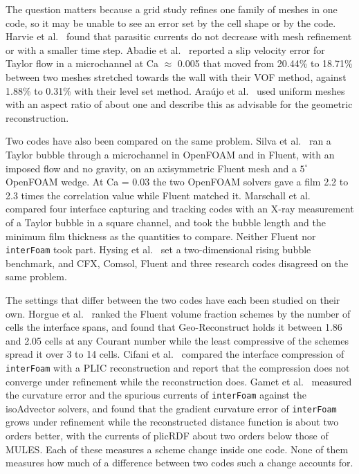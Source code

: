\documentclass[11pt,a4paper]{article}
\begin{document}
The question matters because a grid study refines one family of meshes in one code, so it may be unable to see an error set by the cell shape or by the code. Harvie et al.\ \cite{harvie2006analysis} found that parasitic currents do not decrease with mesh refinement or with a smaller time step. Abadie et al.\ \cite{abadie2015combined} reported a slip velocity error for Taylor flow in a microchannel at Ca $\approx$ 0.005 that moved from 20.44\% to 18.71\% between two meshes stretched towards the wall with their VOF method, against 1.88\% to 0.31\% with their level set method. Ara\'ujo et al.\ \cite{araujo2012wide} used uniform meshes with an aspect ratio of about one and describe this as advisable for the geometric reconstruction.

Two codes have also been compared on the same problem. Silva et al.\ \cite{silva2020numerical} ran a Taylor bubble through a microchannel in OpenFOAM and in Fluent, with an imposed flow and no gravity, on an axisymmetric Fluent mesh and a $5^\circ$ OpenFOAM wedge. At Ca = 0.03 the two OpenFOAM solvers gave a film 2.2 to 2.3 times the correlation value while Fluent matched it. Marschall et al.\ \cite{marschall2014validation} compared four interface capturing and tracking codes with an X-ray measurement of a Taylor bubble in a square channel, and took the bubble length and the minimum film thickness as the quantities to compare. Neither Fluent nor \texttt{interFoam} took part. Hysing et al.\ \cite{hysing2009quantitative} set a two-dimensional rising bubble benchmark, and CFX, Comsol, Fluent and three research codes disagreed on the same problem.

The settings that differ between the two codes have each been studied on their own. Horgue et al.\ \cite{horgue2012suitable} ranked the Fluent volume fraction schemes by the number of cells the interface spans, and found that Geo-Reconstruct holds it between 1.86 and 2.05 cells at any Courant number while the least compressive of the schemes spread it over 3 to 14 cells. Cifani et al.\ \cite{cifani2016comparison} compared the interface compression of \texttt{interFoam} with a PLIC reconstruction and report that the compression does not converge under refinement while the reconstruction does. Gamet et al.\ \cite{gamet2020validation} measured the curvature error and the spurious currents of \texttt{interFoam} against the isoAdvector solvers, and found that the gradient curvature error of \texttt{interFoam} grows under refinement while the reconstructed distance function is about two orders better, with the currents of plicRDF about two orders below those of MULES. Each of these measures a scheme change inside one code. None of them measures how much of a difference between two codes such a change accounts for.
\end{document}
